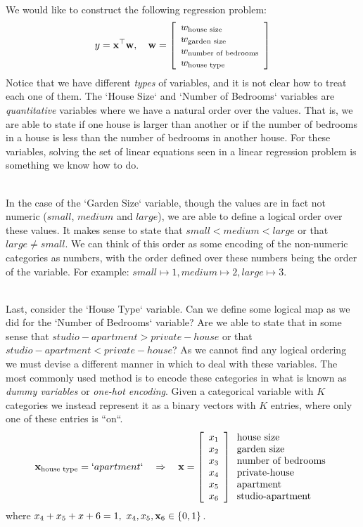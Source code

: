 ~\\We would like to construct the following regression problem: $$ y=\mathbf{x}^\top \mathbf{w},\quad \mathbf{w}=\left[\begin{array}{l}w_{\text{house size}}\\ w_{\text{garden size}}\\ w_{\text{number of bedrooms}}\\ w_{\text{house type}}\end{array}\right] $$
Notice that we have different \textit{types} of variables, and it is not clear how to treat each one of them. The `House Size` and `Number of Bedrooms` variables are \textit{quantitative} variables where we have a natural order over the values. That is, we are able to state if one house is larger than another or if the number of bedrooms in a house is less than the number of bedrooms in another house. For these variables, solving the set of linear equations seen in a linear regression problem is something we know how to do.

~\\In the case of the `Garden Size` variable, though the values are in fact not numeric ($small$, $medium$ and $large$), we are able to define a logical order over these values. It makes sense to state that $small < medium < large$ or that $large \neq small$. We can think of this order as some encoding of the non-numeric categories as numbers, with the order defined over these numbers being the order of the variable. For example: $small\mapsto 1, medium \mapsto 2, large \mapsto 3$.

~\\Last, consider the `House Type` variable. Can we define some logical map as we did for the `Number of Bedrooms` variable? Are we able to state that in some sense that $studio-apartment > private-house$ or that $studio-apartment < private-house$? As we cannot find any logical ordering we must devise a different manner in which to deal with these variables. The most commonly used method is to encode these categories in what is known as \textit{dummy variables} or \textit{one-hot encoding}. Given a categorical variable with $K$ categories we instead represent it as a binary vectors with $K$ entries, where only one of these entries is ``on``. $$ \mathbf{x}_{\text{house type}} = `apartment` \quad \Rightarrow \quad \mathbf{x} =
\left[\begin{array}{c} x_1\\ x_2\\ x_3 \\ x_4 \\ x_5 \\ x_6 \end{array}\right] \begin{array}{l}\text{house size}\\ \text{garden size}\\ \text{number of bedrooms}\\ \text{private-house}\\\text{apartment} \\ \text{studio-apartment} \end{array}
$$
where $x_4+x_5+x+6 = 1, \,\,x_4,x_5,\mathbf{x}_6\in\left\{0,1\right\}$. 


